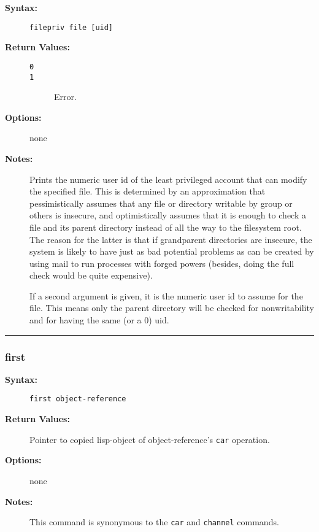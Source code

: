 \begin{description}
\item[{\bf Syntax:}] \mbox{}

{\tt filepriv file [uid]}

\item[{\bf Return Values:}] \mbox{}

\begin{description}
\item[{\tt 0}] \mbox{}



\item[{\tt 1}] \mbox{}

Error.

\end{description}


\item[{\bf Options:}] \mbox{}

none

\item[{\bf Notes:}] \mbox{}

Prints the numeric user id of the least 
privileged account that can modify the specified file. This is 
determined by an approximation that pessimistically assumes that 
any file or directory writable by group or others is insecure, 
and optimistically assumes that it is enough to check a file and 
its parent directory instead of all the way to the filesystem root. 
The reason for the latter is that if grandparent directories are 
insecure, the system is likely to have just as bad potential 
problems as can be created by using mail to run processes with
forged powers (besides, doing the full check would be quite expensive).

If a second argument is given, it is the numeric user id to assume 
for the file. This means only the parent directory will be checked 
for nonwritability and for having the same (or a 0) uid.

\end{description}


\hrule
\subsubsection{first}

\begin{description}
\item[{\bf Syntax:}] \mbox{}

{\tt first object-reference}

\item[{\bf Return Values:}] \mbox{}

Pointer to copied lisp-object of 
object-reference's {\tt car} operation.

\item[{\bf Options:}] \mbox{}

none  

\item[{\bf Notes:}] \mbox{}

This command is synonymous to the {\tt car} 
and {\tt channel} commands.  

\end{description}


